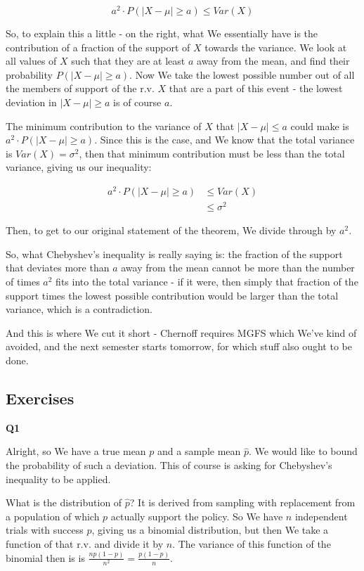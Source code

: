 \documentclass{article}
\begin{document}
		\[ a^2\cdot P(|X-\mu| \ge a) \le Var(X)  \]
		
		So, to explain this a little - on the right, what We essentially have is the contribution of a fraction of the support of $X$ towards the variance. We look at all values of $X$ such that they are at least $a$ away from the mean, and find their probability $P(|X-\mu|\ge a)$. Now We take the lowest possible number out of all the members of support of the r.v. $X$ that are a part of this event - the lowest deviation in $|X-\mu|\ge a$ is of course $a$.
		
		The minimum contribution to the variance of $X$ that $|X-\mu|\le a$ could make is $a^2\cdot P(|X-\mu|\ge a)$. Since this is the case, and We know that the total variance is $Var(X)=\sigma^2$, then that minimum contribution must be less than the total variance, giving us our inequality:
		
		\begin{align*}
		a^2\cdot P(|X-\mu|\ge a) &\le Var(X)\\
		&\le \sigma^2
		\end{align*}
			
		Then, to get to our original statement of the theorem, We divide through by $a^2$. 
		
		So, what Chebyshev's inequality is really saying is: the fraction of the support that deviates more than $a$ away from the mean cannot be more than the number of times $a^2$ fits into the total variance - if it were, then simply that fraction of the support times the lowest possible contribution would be larger than the total variance, which is a contradiction.
		
		And this is where We cut it short - Chernoff requires MGFS which We've kind of avoided, and the next semester starts tomorrow, for which stuff also ought to be done.
		
	\subsection{Exercises}
	
		\textbf{Q1}
		
			Alright, so We have a true mean $p$ and a sample mean $\hat{p}$. We would like to bound the probability of such a deviation. This of course is asking for Chebyshev's inequality to be applied.
			
			What is the distribution of $\hat{p}$? It is derived from sampling with replacement from a population of which $p$ actually support the policy. So We have $n$ independent trials with success $p$, giving us a binomial distribution, but then We take a function of that r.v. and divide it by $n$. The variance of this function of the binomial then is is $\frac{np(1-p)}{n^2} = \frac{p(1-p)}{n}$.
			
\end{document}
